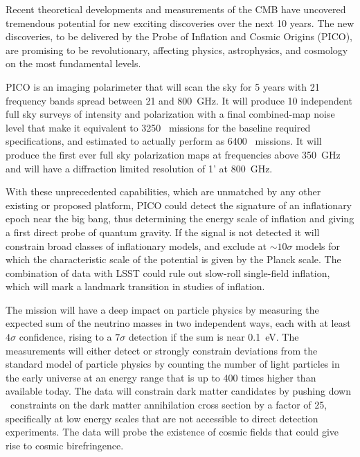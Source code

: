 \documentclass[PICOReport.tex]{subfiles}
\begin{document}
Recent theoretical developments and measurements of the \ac{CMB} have uncovered tremendous potential for new exciting discoveries over the next 10 years. The new discoveries, to be delivered by the Probe of Inflation and Cosmic Origins (PICO), are promising to be revolutionary, affecting physics, astrophysics, and cosmology on the most fundamental levels. 

PICO is an imaging polarimeter that will scan the sky for 5 years with 21 frequency bands spread between 21 and 800~GHz. It will produce 10 independent full sky surveys of intensity and polarization with a final combined-map noise level that make it equivalent to 3250 \planck\ missions for the baseline required specifications, and estimated to actually perform as 6400 \planck\ missions. It will produce the first ever full sky polarization maps at frequencies above 350~GHz and will have a diffraction limited resolution of 1' at 800~GHz. 

With these unprecedented capabilities, which are unmatched by any other existing or proposed platform, PICO could detect the signature of an inflationary epoch near the big bang, thus determining the energy scale of inflation and giving a first direct probe of quantum gravity. If the signal is not detected it will constrain broad classes of inflationary models, and exclude at $\sim10\sigma$ models for which the characteristic scale of the potential is given by the Planck scale. The combination of data with LSST could rule out slow-roll single-field inflation, which will mark a landmark transition in studies of inflation. 

The mission will have a deep impact on particle physics by measuring the expected sum of the neutrino masses in two independent ways, each with at least $4\sigma$ confidence, rising to a $7\sigma$ detection if the sum is near 0.1~eV. The measurements will either detect or strongly constrain deviations from the standard model of particle physics by counting the number of light particles in the early universe at an energy range that is up to 400 times higher than available today. The data will constrain dark matter candidates by pushing down \planck\ constraints on the dark matter annihilation cross section by a factor of 25, specifically at low energy scales that are not accessible to direct detection experiments. The data will probe the existence of cosmic fields that could give rise to cosmic birefringence. 
\end{document}
